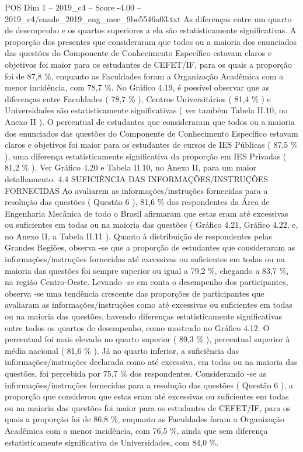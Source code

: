 \begin{textsample}{POS Dim 1 – 2019\_c4 – Score -4.00 – 2019\_c4/enade\_2019\_eng\_mec\_9be5546a03.txt}
As diferenças entre um quarto de desempenho e os quartos superiores a ela são estatisticamente significativas.
A proporção dos presentes que consideraram que todos ou a maioria dos enunciados das questões do Componente de Conhecimento Específico estavam claros e objetivos foi maior para os estudantes de CEFET/IF, para os quais a proporção foi de 87,8 \%, enquanto as Faculdades foram a Organização Acadêmica com a menor incidência, com 78,7 \%.
No Gráfico 4.19, é possível observar que as diferenças entre Faculdades ( 78,7 \% ), Centros Universitários ( 81,4 \% ) e Universidades são estatisticamente significativas ( ver também Tabela II.10, no Anexo II ).
O percentual de estudantes que consideraram que todos ou a maioria dos enunciados das questões do Componente de Conhecimento Específico estavam claros e objetivos foi maior para os estudantes de cursos de IES Públicas ( 87,5 \% ), uma diferença estatisticamente significativa da proporção em IES Privadas ( 81,2 \% ).
Ver Gráfico 4.20 e Tabela II.10, no Anexo II, para um maior detalhamento. 4.4 SUFICIÊNCIA DAS INFORMAÇÕES/INSTRUÇÕES FORNECIDAS Ao avaliarem as informações/instruções fornecidas para a resolução das questões ( Questão 6 ), 81,6 \% dos respondentes da Área de Engenharia Mecânica de todo o Brasil afirmaram que estas eram até excessivas ou suficientes em todas ou na maioria das questões ( Gráfico 4.21, Gráfico 4.22, e, no Anexo II, a Tabela II.11 ).
Quanto à distribuição de respondentes pelas Grandes Regiões, observa -se que a proporção de estudantes que consideraram as informações/instruções fornecidas até excessivas ou suficientes em todas ou na maioria das questões foi sempre superior ou igual a 79,2 \%, chegando a 83,7 \%, na região Centro-Oeste.
Levando -se em conta o desempenho dos participantes, observa -se uma tendência crescente das proporções de participantes que avaliaram as informações/instruções como até excessivas ou suficientes em todas ou na maioria das questões, havendo diferenças estatisticamente significativas entre todos os quartos de desempenho, como mostrado no Gráfico 4.12.
O percentual foi mais elevado no quarto superior ( 89,3 \% ), percentual superior à média nacional ( 81,6 \% ).
Já no quarto inferior, a suficiência das informações/instruções declarada como até excessiva, em todas ou na maioria das questões, foi percebida por 75,7 \% dos respondentes.
Considerando -se as informações/instruções fornecidas para a resolução das questões ( Questão 6 ), a proporção que considerou que estas eram até excessivas ou suficientes em todas ou na maioria das questões foi maior para os estudantes de CEFET/IF, para os quais a proporção foi de 86,8 \%, enquanto as Faculdades foram a Organização Acadêmica com a menor incidência, com 76,5 \%, ainda que sem diferença estatisticamente significativa de Universidades, com 84,0 \%.

\end{textsample}
